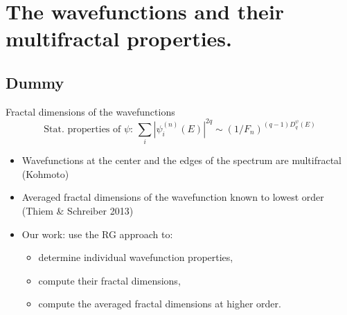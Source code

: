 \documentclass[xcolor=x11names,compress,professionalfonts]{beamer}
\renewcommand{\(}{\begin{columns}}
\renewcommand{\)}{\end{columns}}
\newcommand{\<}[1]{\begin{column}{#1}}
\renewcommand{\>}{\end{column}}
\begin{document}
\section{The wavefunctions and their multifractal properties.}
\subsection{Dummy}
\begin{frame}{Fractal dimensions of the wavefunctions}
	\[
	\text{Stat. properties of $\psi$:~} 
	\sum_i |\psi_i^{(n)}(E)|^{2q} \sim (1/F_n)^{(q-1)D_q^\psi(E)} 
	\]
\begin{itemize}
	\item Wavefunctions at the center and the edges of the spectrum are multifractal (Kohmoto)
	\item Averaged fractal dimensions of the wavefunction known to lowest order  (Thiem \& Schreiber 2013)
	\item Our work: use the RG approach to:
	\begin{itemize}
		\item  determine individual wavefunction properties,
		\item compute their fractal dimensions,
		\item compute the averaged fractal dimensions at higher order.
	\end{itemize}
\end{itemize}
\end{frame}
\end{document}
